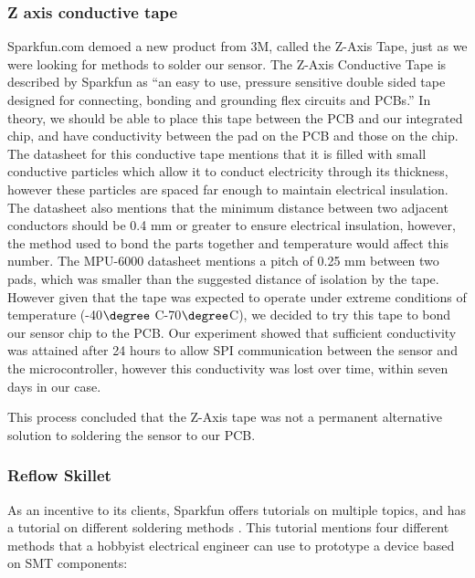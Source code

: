 \subsubsection{Z axis conductive tape}
\label{Sec:ZTape}
Sparkfun.com demoed \cite{Web:SFETAPEV} a new product from 3M,
called the Z-Axis Tape,
just as we were looking for methods to solder our sensor.
The Z-Axis Conductive Tape is described by Sparkfun as ``an easy to use,
pressure sensitive double sided tape designed for connecting,
bonding and grounding flex circuits and PCBs.''
In theory, we should be able to place this tape between the PCB and our integrated chip,
and have conductivity between the pad on the PCB and those on the chip.
The datasheet for this conductive tape mentions that it is filled with small conductive particles which allow it to conduct electricity through its thickness,
however these particles are spaced far enough to maintain electrical insulation.
The datasheet also mentions that the minimum distance between two adjacent conductors should be 0.4 mm or greater to ensure electrical insulation,
however, the method used to bond the parts together and temperature would affect this number.
The MPU-6000 datasheet mentions a pitch of 0.25 mm between two pads,
which was smaller than the suggested distance of isolation by the tape.
However given that the tape was expected to operate under extreme conditions of temperature (-40$\degree$ C-70$\degree$C),
we decided to try this tape to bond our sensor chip to the PCB.
Our experiment showed that sufficient conductivity was attained after 24 hours to allow SPI communication between the sensor and the microcontroller,
however this conductivity was lost over time,
within seven days in our case.

This process concluded that the Z-Axis tape was not a permanent alternative solution to soldering the sensor to our PCB.

\subsubsection{Reflow Skillet}
\label{Sec:ToasterReflow}
As an incentive to its clients,
Sparkfun offers tutorials on multiple topics,
and has a tutorial on different soldering methods \cite{Web:SparkfunSoldering}.
This tutorial mentions four different methods that a hobbyist electrical engineer can use to prototype a device based on SMT components:

